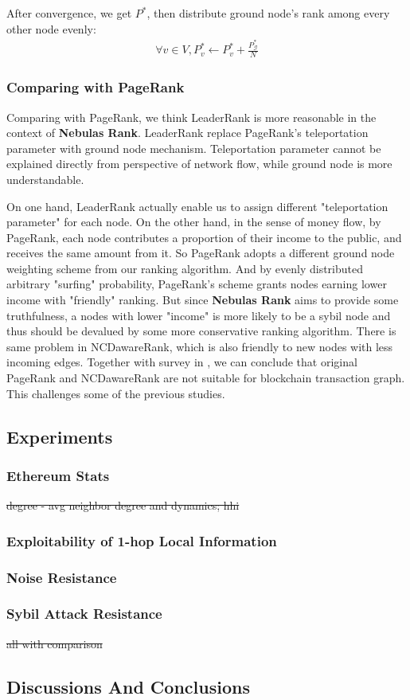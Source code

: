 After convergence, we get $P^*$, then distribute ground node's rank among every other node evenly:
\begin{align}
\forall v \in V, P^*_v \leftarrow P^*_v + \frac{P^*_{\mathcal{G}}}{N}
\end{align}

\subsubsection{Comparing with PageRank}
Comparing with PageRank, we think LeaderRank is more reasonable in the context of \textbf{Nebulas Rank}. LeaderRank replace PageRank's teleportation parameter\cite{Brin2010}\cite{page1999pagerank} with ground node mechanism. Teleportation parameter cannot be explained directly from perspective of network flow, while ground node is more understandable.

On one hand, LeaderRank actually enable us to assign different "teleportation parameter" for each node. On the other hand, in the sense of money flow, by PageRank, each node contributes a proportion of their income to the public, and receives the same amount from it. So PageRank adopts a different ground node weighting scheme from our ranking algorithm. And by evenly distributed arbitrary "surfing" probability, PageRank's scheme grants nodes earning lower income with "friendly" ranking. But since \textbf{Nebulas Rank} aims to provide some truthfulness, a nodes with lower "income" is more likely to be a sybil node and thus should be devalued by some more conservative ranking algorithm. There is same problem in NCDawareRank\cite{Nikolakopoulos2013}, which is also friendly to new nodes with less incoming edges. Together with survey in , we can conclude that original PageRank and NCDawareRank are not suitable for blockchain transaction graph. This challenges some of the previous studies\cite{Fleder2015}\cite{nem}.

\subsection{Experiments} \label{sec:exp}

\subsubsection{Ethereum Stats}
\st{degree - avg neighbor degree and dynamics; hhi}
\subsubsection{Exploitability of 1-hop Local Information}
\subsubsection{Noise Resistance}
\subsubsection{Sybil Attack Resistance}
\st{all with comparison}

\subsection{Discussions And Conclusions} \label{sec:discuss}
